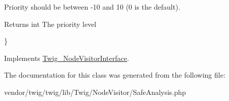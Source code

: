 Priority should be between -\/10 and 10 (0 is the default).

\begin{DoxyReturn}{Returns}
int The priority level
\end{DoxyReturn}
\} 

Implements \hyperlink{interfaceTwig__NodeVisitorInterface_a9ad5ef7f873c47ded2423071fa3218d3}{Twig\+\_\+\+Node\+Visitor\+Interface}.



The documentation for this class was generated from the following file\+:\begin{DoxyCompactItemize}
\item 
vendor/twig/twig/lib/\+Twig/\+Node\+Visitor/Safe\+Analysis.\+php\end{DoxyCompactItemize}
